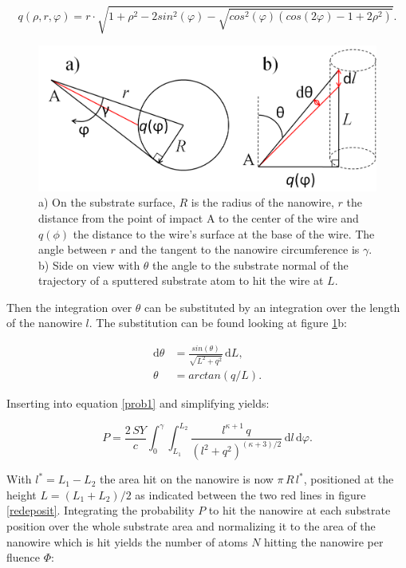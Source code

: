 \begin{equation}
q(\rho,r,\varphi) = r\cdot \sqrt{1 + \rho^2 - 2sin^2(\varphi) - \sqrt{cos^2(\varphi)(cos(2\varphi) - 1 + 2\rho^2)}}.
\end{equation}

\begin{figure}
	\centering
		\includegraphics[width=.65\textwidth]{images/anglesredeposition.jpg}
	\caption{a) On the substrate surface, $R$ is the radius of the nanowire, $r$ the distance from the point of impact A to the center of the wire and $q(\phi)$ the distance to the wire's surface at the base of the wire. The angle between $r$ and the tangent to the nanowire circumference is $\gamma$. b) Side on view with $\theta$ the angle to the substrate normal of the trajectory of a sputtered substrate atom to hit the wire at $L$.} 
	\label{anglesredepo}
\end{figure} 

Then the integration over $\theta$ can be substituted by an integration over the length of the nanowire $l$. The substitution can be found looking at figure \ref{anglesredepo}b:

\begin{align*}
\mathrm{d}\theta &= \frac{sin(\theta)}{\sqrt{L^2 + q^2}}\,\mathrm{d}L,\\
\theta &= arctan(q/L).
\end{align*}

Inserting into equation \ref{prob1} and simplifying yields:

\begin{equation}
\label{prob2}
P = \frac{2\,SY}{c} \int_0^{\gamma} \! \int_{L_1}^{L_2} \!  \frac{l^{\kappa+1}\,q}{(l^2 + q^2)^{(\kappa + 3)/2}} \,\mathrm{d}l \, \mathrm{d}\varphi.
\end{equation}

With $l^*=L_1-L_2$ the area hit on the nanowire is now $\pi \, R \, l^*$, positioned at the height $L= (L_1+L_2)/2$ as indicated between the two red lines in figure \ref{redeposit}. Integrating the probability $P$ to hit the nanowire at each substrate position over the whole substrate area and normalizing it to the area of the nanowire which is hit yields the number of atoms $N$ hitting the nanowire per fluence $\Phi$:

